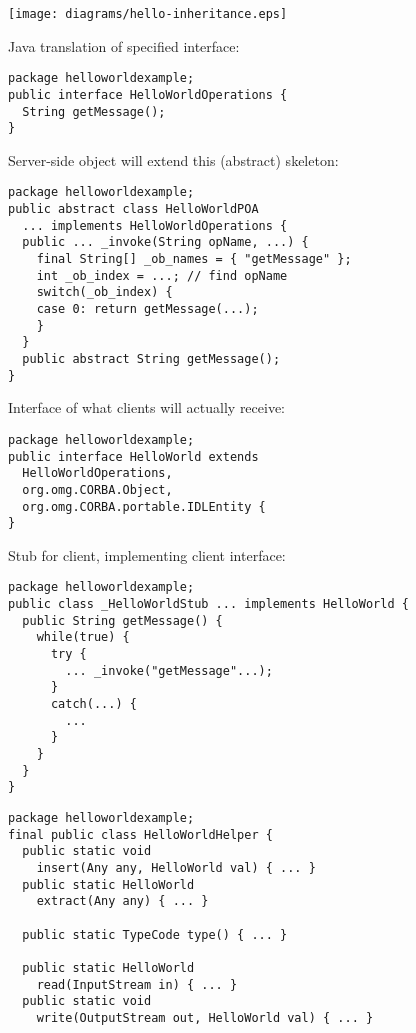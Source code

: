 \documentclass{sepslide-soa-faked} %
\begin{document}
\begin{slide}
\texttt{[image: diagrams/hello-inheritance.eps]}
\end{slide}

\begin{slide}
Java translation of specified interface:
\begin{verbatim}
package helloworldexample;
public interface HelloWorldOperations {
  String getMessage();
}
\end{verbatim}
\end{slide}

\begin{slide}
Server-side object will extend this (abstract) skeleton:
\begin{verbatim}
package helloworldexample;
public abstract class HelloWorldPOA 
  ... implements HelloWorldOperations {
  public ... _invoke(String opName, ...) {
    final String[] _ob_names = { "getMessage" };
    int _ob_index = ...; // find opName
    switch(_ob_index) {
    case 0: return getMessage(...);
    }
  }
  public abstract String getMessage();
}
\end{verbatim}
\end{slide}

\begin{slide}
Interface of what clients will actually receive:
\begin{verbatim}
package helloworldexample;
public interface HelloWorld extends
  HelloWorldOperations,
  org.omg.CORBA.Object,
  org.omg.CORBA.portable.IDLEntity {
}
\end{verbatim}
\end{slide}

\begin{slide}
Stub for client, implementing client interface:
\begin{verbatim}
package helloworldexample;
public class _HelloWorldStub ... implements HelloWorld {
  public String getMessage() {
    while(true) {
      try {
        ... _invoke("getMessage"...);
      }
      catch(...) {
        ...
      }
    }
  }
}
\end{verbatim}
\end{slide}

\begin{slide}
\begin{verbatim}
package helloworldexample;
final public class HelloWorldHelper {
  public static void
    insert(Any any, HelloWorld val) { ... }
  public static HelloWorld
    extract(Any any) { ... }

  public static TypeCode type() { ... }

  public static HelloWorld
    read(InputStream in) { ... }
  public static void
    write(OutputStream out, HelloWorld val) { ... }
\end{verbatim}
\end{slide}
\end{document}
